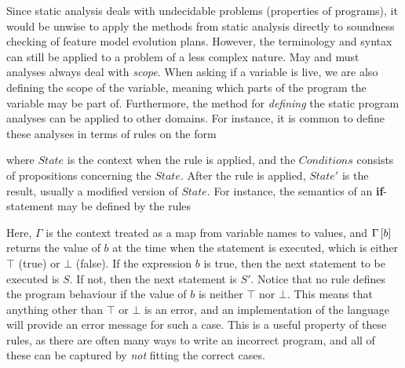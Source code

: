Since static analysis deals with undecidable problems (properties of programs), it would be unwise to apply the methods from static analysis directly to soundness checking of feature model evolution plans. However, the terminology and syntax can still be applied to a problem of a less complex nature. May and must analyses always deal with \emph{scope}. When asking if a variable is live, we are also defining the scope of the variable, meaning which parts of the program the variable may be part of. Furthermore, the method for \emph{defining} the static program analyses can be applied to other domains. For instance, it is common to define these analyses in terms of rules on the form

\begin{prooftree}
\end{prooftree} 

where $State$ is the context when the rule is applied, and the $Conditions$ consists of propositions concerning the $State$. After the rule is applied, $State'$ is the result, usually a modified version of $State$. For instance, the semantics of an \textbf{if}-statement may be defined by the rules

\begin{minipage}{0.5\textwidth}
   \footnotesize
\begin{prooftree}
\end{prooftree}
\end{minipage}
\begin{minipage}{0.5\textwidth}
   \footnotesize
\begin{prooftree}
\end{prooftree}
\end{minipage}

Here, $\Gamma$ is the context treated as a map from variable names to values, and $\lookup{\Gamma}{b}$ returns the value of $b$ at the time when the statement is executed, which is either $\top$ (true) or $\bot$ (false). If the expression $b$ is true, then the next statement to be executed is $S$. If not, then the next statement is $S'$. Notice that no rule defines the program behaviour if the value of $b$ is neither $\top$ nor $\bot$. This means that anything other than $\top$ or $\bot$ is an error, and an implementation of the language will provide an error message for such a case. This is a useful property of these rules, as there are often many ways to write an incorrect program, and all of these can be captured by \emph{not} fitting the correct cases.


